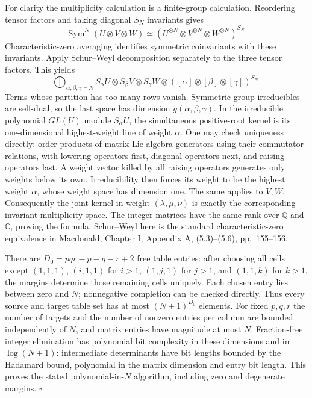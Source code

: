 For clarity the multiplicity calculation is a finite-group
calculation. Reordering tensor factors and taking diagonal
$S_N$ invariants gives
\[
 \operatorname{Sym}^N(U\otimes V\otimes W)
 \simeq (U^{\otimes N}\otimes V^{\otimes N}
                  \otimes W^{\otimes N})^{S_N}.
\]
Characteristic-zero averaging identifies symmetric coinvariants
with these invariants. Apply Schur--Weyl decomposition separately
to the three tensor factors. This yields
\[
 \bigoplus_{\alpha,\beta,\gamma\vdash N}
 S_\alpha U\otimes S_\beta V\otimes S_\gamma W\otimes
 ([\alpha]\otimes[\beta]\otimes[\gamma])^{S_N}.
\]
Terms whose partition has too many rows vanish. Symmetric-group
irreducibles are self-dual, so the last space has dimension
$g(\alpha,\beta,\gamma)$. In the irreducible polynomial
$GL(U)$ module $S_\alpha U$, the simultaneous positive-root
kernel is its one-dimensional highest-weight line of weight
$\alpha$. One may check uniqueness directly: order products of
matrix Lie algebra generators using their commutator relations,
with lowering operators first, diagonal operators next, and
raising operators last. A weight vector killed by all raising
operators generates only weights below its own. Irreducibility
then forces its weight to be the highest weight $\alpha$, whose
weight space has dimension one. The same applies to $V,W$.
Consequently the joint kernel in weight $(\lambda,\mu,\nu)$ is
exactly the corresponding invariant multiplicity space. The
integer matrices have the same rank over $\mathbb Q$ and
$\mathbb C$, proving the formula. Schur--Weyl here is the standard
characteristic-zero equivalence in Macdonald, Chapter I,
Appendix A, (5.3)--(5.6), pp.~155--156.

There are
$D_0=pqr-p-q-r+2$ free table entries: after choosing all cells
except $(1,1,1)$, $(i,1,1)$ for $i>1$, $(1,j,1)$ for $j>1$,
and $(1,1,k)$ for $k>1$, the margins determine those remaining
cells uniquely. Each chosen entry lies between zero and $N$;
nonnegative completion can be checked directly. Thus every
source and target table set has at most $(N+1)^{D_0}$ elements.
For fixed $p,q,r$ the number of targets and the number of nonzero
entries per column are bounded independently of $N$, and matrix
entries have magnitude at most $N$. Fraction-free integer
elimination has polynomial bit complexity in these dimensions
and in $\log(N+1)$: intermediate determinants have bit lengths
bounded by the Hadamard bound, polynomial in the matrix dimension
and entry bit length. This proves the stated polynomial-in-$N$
algorithm, including zero and degenerate margins. \hfill$\square$

